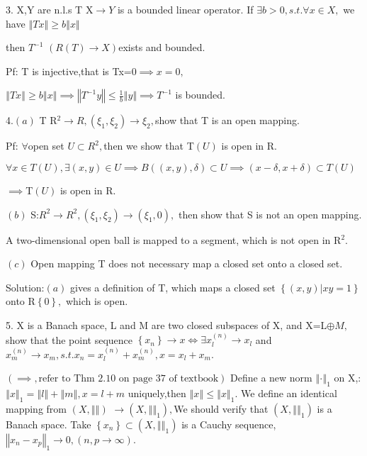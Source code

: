 \documentclass{article}
\begin{document}
\begin{CJK}{GBK}{song}
3. X,Y are n.l.s T X$\rightarrow Y$ is a bounded linear operator. If $%
\exists b>0,s.t.\forall x\in X,$ we have $\left\Vert Tx\right\Vert \geq
b\left\Vert x\right\Vert $

then $T^{-1}$ $\left( R\left( T\right) \rightarrow X\right) $exists and
bounded.

Pf: T is injective,that is Tx=0$\implies x=0,$

\bigskip $\left\Vert Tx\right\Vert \geq b\left\Vert x\right\Vert \implies
\left\Vert T^{-1}y\right\Vert \leq \frac{1}{b}\left\Vert y\right\Vert
\implies T^{-1}$ is bounded.

4.$\left( a\right) $ T R$^{2}\rightarrow R,\left( \xi _{1},\xi _{2}\right)
\rightarrow \xi _{2},$show that T is an open mapping.

Pf: $\forall $open set $U\subset R^{2},$then we show that T$\left( U\right) $
is open in R.

$\forall x\in T\left( U\right) ,\exists \left( x,y\right) \in U\implies
B\left( \left( x,y\right) ,\delta \right) \subset U\implies \left( x-\delta
,x+\delta \right) \subset T\left( U\right) $

$\implies $T$\left( U\right) $ is open in R.

$\left( b\right) $ S:$R^{2}\rightarrow R^{2},\left( \xi _{1},\xi _{2}\right)
\rightarrow \left( \xi _{1},0\right) ,$ then show that S is not an open
mapping.

A two-dimensional open ball is mapped to a segment, which is not open in R$%
^{2}.$

$\left( c\right) $ Open mapping T does not necessary map a closed set onto a
closed set.

Solution:$\left( a\right) $ gives a definition of T, which maps a closed set 
$\left\{ \left( x,y\right) |xy=1\right\} $ onto R\TEXTsymbol{\backslash}$%
\left\{ 0\right\} ,$ which is open.

5. X is a Banach space, L and M are two closed subspaces of X, and X=L$%
\oplus M,$show that the point sequence $\left\{ x_{n}\right\} \rightarrow
x\iff \exists x_{l}^{\left( n\right) }\rightarrow x_{l}$ and $x_{m}^{\left(
n\right) }\rightarrow x_{m},s.t.x_{n}=x_{l}^{\left( n\right) }+x_{m}^{\left(
n\right) },x=x_{l}+x_{m}.$

$\left( \implies ,\text{refer to Thm 2.10 on page 37 of textbook}\right) $%
Define a new norm $\left\Vert \cdot \right\Vert _{1}$ on X,:$\left\Vert
x\right\Vert _{1}=\left\Vert l\right\Vert +\left\Vert m\right\Vert ,x=l+m$
uniquely,then $\left\Vert x\right\Vert \leq \left\Vert x\right\Vert _{1}.$
We define an identical mapping from $\left( X,\left\Vert {}\right\Vert
\right) $ $\rightarrow \left( X,\left\Vert {}\right\Vert _{1}\right) ,$We
should verify that $\left( X,\left\Vert {}\right\Vert _{1}\right) $ is a
Banach space. Take $\left\{ x_{n}\right\} \subset \left( X,\left\Vert
{}\right\Vert _{1}\right) $ is a Cauchy sequence, $\left\Vert
x_{n}-x_{p}\right\Vert _{1}\rightarrow 0,\left( n,p\rightarrow \infty
\right) .$


\end{CJK}
\end{document}
